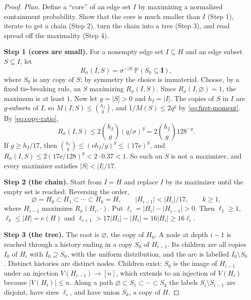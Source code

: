 \documentclass[11pt]{article}
\numberwithin{equation}{section}
\newcommand{\PP}{\mathbb P}
\newcommand{\ee}{\mathrm e}
\newcommand{\Step}[1]{\par\smallskip\noindent\textbf{Step #1.}}
\begin{document}
\begin{proof}
\emph{Plan.} Define a ``core'' of an edge set $I$ by maximizing a normalized
containment probability. Show that the core is much smaller than $I$ (Step 1),
iterate to get a chain (Step 2), turn the chain into a tree (Step 3), and read
spread off the maximality (Step 4).

\Step{1 (cores are small)} For a nonempty edge set $I\subseteq H$ and an edge
subset $S\subseteq I$, let
\begin{equation}\label{eq:maximizer}
 R_\sigma(I,S)=\sigma^{-|S|}\,\PP(S_0\subseteq\boldsymbol I),
\end{equation}
where $S_0$ is any copy of $S$; by symmetry the choice is immaterial. Choose,
by a fixed tie-breaking rule, an $S$ maximizing $R_\sigma(I,S)$. Since
$R_\sigma(I,\varnothing)=1$, the maximum is at least $1$. Now let $g=|S|>0$ and
$h_I=|I|$. The copies of $S$ in $I$ are $g$-subsets of $I$, so
$M(I,S)\le\binom{h_I}g$, and $1/M(S)\le2q^g$ by \eqref{eq:first-moment}. By
\eqref{eq:copy-ratio},
\[
 R_\sigma(I,S)\le2\binom{h_I}g(q/\sigma)^g=2\binom{h_I}g128^{-g}.
\]
If $g\ge h_I/17$, then $\binom{h_I}g\le(\ee h_I/g)^g\le(17\ee)^g$, and
$R_\sigma(I,S)\le2(17\ee/128)^g<2\cdot0.37<1$. So such an $S$ is not a
maximizer, and every maximizer satisfies $|S|<|I|/17$.

\Step{2 (the chain)} Start from $I=H$ and replace $I$ by its maximizer until
the empty set is reached. Reversing the order,
\[
 \varnothing=H_0\subset H_1\subset\cdots\subset H_k=H,\qquad
 |H_{i-1}|<|H_i|/17,\qquad k\ge1,
\]
where $H_{i-1}$ maximizes $R_\sigma(H_i,\cdot)$. Put
$\ell_i=|H_i|-|H_{i-1}|>0$. Then $\ell_1\ge1$, $\ell_k\le|H|=e(H)$ and
$\ell_{i+1}>17|H_i|-|H_i|=16|H_i|\ge16\ell_i$.

\Step{3 (the tree)} The root is $\varnothing$, the copy of $H_0$. A node at
depth $i-1$ is reached through a history ending in a copy $S_0$ of $H_{i-1}$.
Its children are all copies $I_0$ of $H_i$ with $I_0\supseteq S_0$, with the
uniform distribution, and the arc is labelled $I_0\setminus S_0$. Distinct
histories are distinct nodes. Children exist: $S_0$ is the image of $H_{i-1}$
under an injection $V(H_{i-1})\to[n]$, which extends to an injection of
$V(H_i)$ because $|V(H_i)|\le n$. Along a path
$\varnothing\subset S_1\subset\cdots\subset S_k$ the labels
$S_i\setminus S_{i-1}$ are disjoint, have sizes $\ell_i$, and have union $S_k$,
a copy of $H$.


\end{proof}
\end{document}
